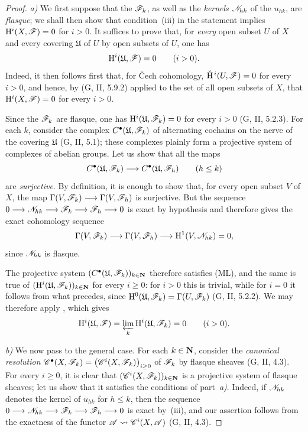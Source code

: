\begin{proof}
\emph{a)}
We first suppose that the $\mathscr{F}_k$, as well as the \emph{kernels}
$\mathscr{N}_{hk}$ of the $u_{hk}$, are \emph{flasque}; we shall then show that
condition~{\rm(iii)} in the statement implies
$\mathrm{H}^i(X,\mathscr{F})=0$ for $i>0$.
It suffices to prove that, for \emph{every} open subset $U$ of $X$ and every
covering $\mathfrak{U}$ of $U$ by open subsets of $U$, one has
\[
  \mathrm{H}^i(\mathfrak{U},\mathscr{F})=0
  \qquad (i>0).
\]
Indeed, it then follows first that, for \v{C}ech cohomology,
$\check{\mathrm{H}}^{\,i}(U,\mathscr{F})=0$ for every $i>0$, and hence, by
(G, II, 5.9.2) applied to the set of all open subsets of $X$, that
$\mathrm{H}^i(X,\mathscr{F})=0$ for every $i>0$.

Since the $\mathscr{F}_k$ are flasque, one has
$\mathrm{H}^i(\mathfrak{U},\mathscr{F}_k)=0$ for every $i>0$
(G, II, 5.2.3).
For each $k$, consider the complex
$C^\bullet(\mathfrak{U},\mathscr{F}_k)$ of alternating
cochains on the nerve of the covering $\mathfrak{U}$ (G, II, 5.1);
these complexes plainly form a projective system of complexes of
abelian groups.
Let us show that all the maps
\[
  C^\bullet(\mathfrak{U},\mathscr{F}_k)
  \longrightarrow
  C^\bullet(\mathfrak{U},\mathscr{F}_h)
  \qquad(h\leq k)
\]
are \emph{surjective}.
By definition, it is enough to show that, for every open subset $V$
of $X$, the map
$\Gamma(V,\mathscr{F}_k)\longrightarrow\Gamma(V,\mathscr{F}_h)$ is
surjective. But the sequence $0\longrightarrow\mathscr{N}_{hk}\longrightarrow\mathscr{F}_k
\longrightarrow\mathscr{F}_h\longrightarrow0$
is exact by hypothesis and therefore gives the exact cohomology
sequence
\[
  \Gamma(V,\mathscr{F}_k)\longrightarrow\Gamma(V,\mathscr{F}_h)
  \longrightarrow\mathrm{H}^1(V,\mathscr{N}_{hk})=0,
\]
since $\mathscr{N}_{hk}$ is flasque.

The projective system
$(C^\bullet(\mathfrak{U},\mathscr{F}_k))_{k\in\mathbf{N}}$
therefore satisfies (ML), and the same is true of
$(\mathrm{H}^i(\mathfrak{U},\mathscr{F}_k))_{k\in\mathbf{N}}$ for every $i\geq0$:
for $i>0$ this is trivial, while for $i=0$ it follows from what
precedes, since
$\mathrm{H}^0(\mathfrak{U},\mathscr{F}_k)=\Gamma(U,\mathscr{F}_k)$
(G, II, 5.2.2).
We may therefore apply , which gives
\[
  \mathrm{H}^i(\mathfrak{U},\mathscr{F})
  =
  \varprojlim_k\mathrm{H}^i(\mathfrak{U},\mathscr{F}_k)
  =0
  \qquad(i>0).
\]

\emph{b)}
We now pass to the general case. For each $k\in\mathbf{N}$, consider the
\emph{canonical resolution} $\mathscr{C}^\bullet(X,\mathscr{F}_k)
=
\bigl(\mathscr{C}^i(X,\mathscr{F}_k)\bigr)_{i\geq0}$
of $\mathscr{F}_k$ by flasque sheaves (G, II, 4.3).
For every $i\geq0$, it is clear that
$(\mathscr{C}^i(X,\mathscr{F}_k))_{k\in\mathbf{N}}$ is a projective system of
flasque sheaves; let us show that it satisfies the conditions of
part~\emph{a)}.
Indeed, if $\mathscr{N}_{hk}$ denotes the kernel of $u_{hk}$ for $h\leq k$,
then the sequence $0\longrightarrow\mathscr{N}_{hk}\longrightarrow\mathscr{F}_k
\longrightarrow\mathscr{F}_h\longrightarrow0$
is exact by~{\rm(iii)}, and our assertion follows from the exactness
of the functor
$\mathscr{A}\leadsto\mathscr{C}^i(X,\mathscr{A})$ (G, II, 4.3).


\end{proof}
